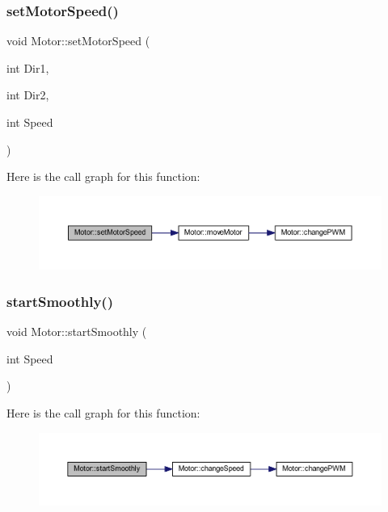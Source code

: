 \subsubsection{\texorpdfstring{set\+Motor\+Speed()}{setMotorSpeed()}\hspace{0.1cm}{\footnotesize\ttfamily [2/2]}}
{\footnotesize\ttfamily void Motor\+::set\+Motor\+Speed (\begin{DoxyParamCaption}\item[{int}]{Dir1,  }\item[{int}]{Dir2,  }\item[{int}]{Speed }\end{DoxyParamCaption})}

Here is the call graph for this function\+:
\nopagebreak
\begin{figure}[H]
\begin{center}
\leavevmode
\includegraphics[width=350pt]{d1/d6b/class_motor_af6e0f394e5d028bdd8cf9ce5e0fed919_cgraph}
\end{center}
\end{figure}
\mbox{\label{class_motor_aba12da45ff90906b5ad4f2a224d5317d}} 
\subsubsection{\texorpdfstring{start\+Smoothly()}{startSmoothly()}}
{\footnotesize\ttfamily void Motor\+::start\+Smoothly (\begin{DoxyParamCaption}\item[{int}]{Speed }\end{DoxyParamCaption})}

Here is the call graph for this function\+:
\nopagebreak
\begin{figure}[H]
\begin{center}
\leavevmode
\includegraphics[width=350pt]{d1/d6b/class_motor_aba12da45ff90906b5ad4f2a224d5317d_cgraph}
\end{center}
\end{figure}
\mbox{\label{class_motor_a17eb92ef52d3cb10bc9f6b88b7c34dcc}} 
